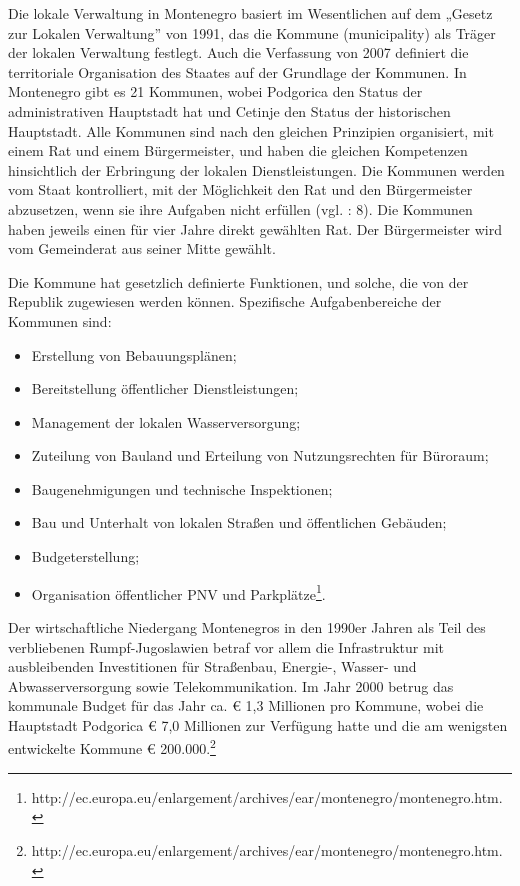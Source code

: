 Die lokale Verwaltung in Montenegro basiert im Wesentlichen auf dem „Gesetz zur Lokalen Verwaltung” von 1991, das die Kommune (municipality) als Träger der lokalen Verwaltung festlegt. Auch die Verfassung von 2007 definiert die territoriale Organisation des Staates auf der Grundlage der Kommunen. In Montenegro gibt es 21 Kommunen, wobei Podgorica den Status der administrativen Hauptstadt hat und Cetinje den Status der historischen Hauptstadt. Alle Kommunen sind nach den gleichen Prinzipien organisiert, mit einem Rat und einem Bürgermeister, und haben die gleichen Kompetenzen hinsichtlich der Erbringung der lokalen Dienstleistungen. Die Kommunen werden vom Staat kontrolliert, mit der Möglichkeit den Rat und den Bürgermeister abzusetzen, wenn sie ihre Aufgaben nicht erfüllen (vgl. \cite{oecd08b}: 8). Die Kommunen haben jeweils einen für vier Jahre direkt gewählten Rat. Der Bürgermeister wird vom Gemeinderat aus seiner Mitte gewählt.\par
Die Kommune hat gesetzlich definierte Funktionen, und solche, die von der Republik zugewiesen werden können. Spezifische Aufgabenbereiche der Kommunen sind:
\begin{itemize} \itemsep1pt \parskip0pt 
\item Erstellung von Bebauungsplänen;
\item Bereitstellung öffentlicher Dienstleistungen;
\item Management der lokalen Wasserversorgung;
\item Zuteilung von Bauland und Erteilung von Nutzungsrechten für Büroraum;
\item Baugenehmigungen und technische Inspektionen;
\item Bau und Unterhalt von lokalen Straßen und öffentlichen Gebäuden;
\item Budgeterstellung;
\item Organisation öffentlicher PNV und Parkplätze\footnote{http://ec.europa.eu/enlargement/archives/ear/montenegro/montenegro.htm.}. 
\end{itemize}
Der wirtschaftliche Niedergang Montenegros in den 1990er Jahren als Teil des verbliebenen Rumpf-Jugoslawien betraf vor allem die Infrastruktur mit ausbleibenden Investitionen für Straßenbau, Energie-, Wasser- und Abwasserversorgung sowie Telekommunikation. Im Jahr 2000 betrug das kommunale Budget für das Jahr ca.  \euro{}  1,3 Millionen pro Kommune, wobei die Hauptstadt Podgorica  \euro{}  7,0 Millionen zur Verfügung hatte und die am wenigsten entwickelte Kommune  \euro{} 200.000.\footnote{http://ec.europa.eu/enlargement/archives/ear/montenegro/montenegro.htm.}\par
